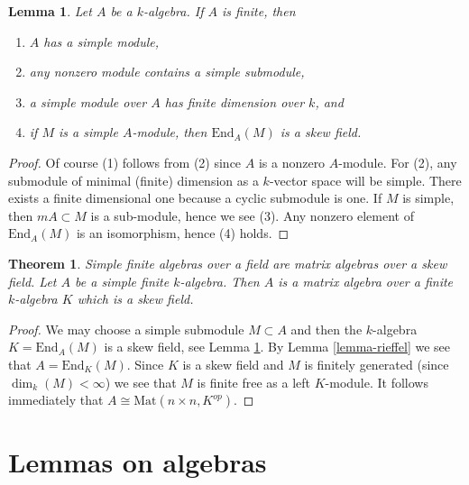 \documentclass{stacks-project}
\newenvironment{slogan}{\comment}{\endcomment}
\theoremstyle{plain}
\newtheorem{theorem}[subsection]{Theorem}
\newtheorem{lemma}[subsection]{Lemma}
\theoremstyle{definition}
\theoremstyle{remark}
\numberwithin{equation}{subsection}
\begin{document}
\begin{lemma}
\label{lemma-simple-module}
Let $A$ be a $k$-algebra. If $A$ is finite, then
\begin{enumerate}
\item $A$ has a simple module,
\item any nonzero module contains a simple submodule,
\item a simple module over $A$ has finite dimension over $k$, and
\item if $M$ is a simple $A$-module, then $\text{End}_A(M)$ is a
skew field.
\end{enumerate}
\end{lemma}

\begin{proof}
Of course (1) follows from (2) since $A$ is a nonzero $A$-module.
For (2), any submodule of minimal (finite) dimension as a $k$-vector
space will be simple. There exists a finite dimensional one
because a cyclic submodule is one. If $M$ is simple, then
$mA \subset M$ is a sub-module, hence we see (3). Any nonzero element
of $\text{End}_A(M)$ is an isomorphism, hence (4) holds.
\end{proof}

\begin{theorem}
\label{theorem-wedderburn}
\begin{slogan}
Simple finite algebras over a field are matrix algebras over a skew field.
\end{slogan}
Let $A$ be a simple finite $k$-algebra. Then $A$ is a matrix algebra over
a finite $k$-algebra $K$ which is a skew field.
\end{theorem}

\begin{proof}
We may choose a simple submodule $M \subset A$ and then
the $k$-algebra $K = \text{End}_A(M)$ is a skew field, see
Lemma \ref{lemma-simple-module}.
By
Lemma \ref{lemma-rieffel}
we see that $A = \text{End}_K(M)$. Since $K$ is a skew field and
$M$ is finitely generated (since $\dim_k(M) < \infty$) we see that
$M$ is finite free as a left $K$-module. It follows immediately that
$A \cong \text{Mat}(n \times n, K^{op})$.
\end{proof}






\section{Lemmas on algebras}
\label{section-lemmas}
\end{document}
